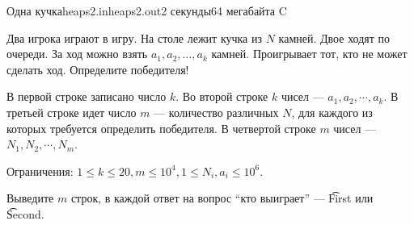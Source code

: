 \begin{problem}{Одна кучка}{heaps2.in}{heaps2.out}{2 секунды}{64 мегабайта}
{C}

Два игрока играют в игру. На столе лежит кучка из $N$ камней.
Двое ходят по очереди.
За ход можно взять $a_1, a_2, \ldots, a_k$ камней.
Проигрывает тот, кто не может сделать ход. Определите победителя!

\InputFile

В первой строке записано число $k$.
Во второй строке $k$ чисел --- $a_1, a_2, \cdots, a_k$.
В третьей строке идет число $m$ --- количество различных $N$, для каждого из которых требуется определить победителя.
В четвертой строке $m$ чисел --- $N_1, N_2, \cdots, N_m$.

Ограничения: $1 \le k \le 20, m \le 10^4, 1 \le N_i, a_i \le 10^6$.

\OutputFile

Выведите $m$ строк, в каждой ответ на вопрос ``кто выиграет'' --- \t{First} или \t{Second}.

\Example

\begin{example}
%
\end{example}

\end{problem}
